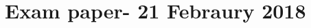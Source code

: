 \documentclass[\main/main.tex]{subfiles}
\begin{document}
\section{Exam paper- 21 Febraury 2018}


\clearpage

\clearpage

\clearpage

\clearpage

\clearpage

\clearpage

\clearpage

\end{document}

